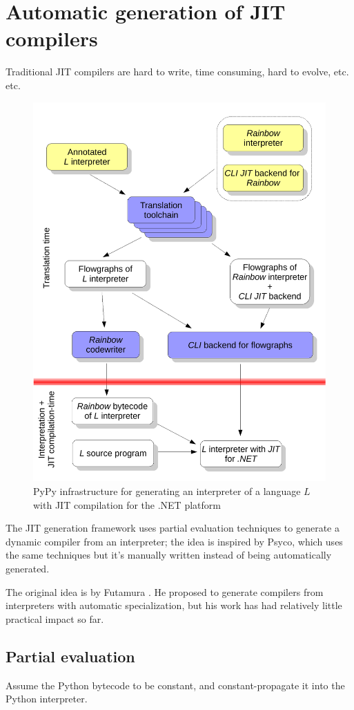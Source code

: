 \section{Automatic generation of JIT compilers}

Traditional JIT compilers are hard to write, time consuming, hard to evolve,
etc. etc.

\begin{figure}[h]
\begin{center}
\includegraphics[width=.6\textwidth]{diagram1}
\caption{PyPy infrastructure for generating an interpreter of a
  language $L$ with JIT compilation for the .NET platform}
\end{center}
\end{figure}

The JIT generation framework uses partial evaluation techniques to generate a
dynamic compiler from an interpreter; the idea is inspired by Psyco, which
uses the same techniques but it's manually written instead of being
automatically generated.

The original idea is by Futamura \cite{Futamura99}. He proposed to generate compilers
from interpreters with automatic specialization, but his work has had
relatively little practical impact so far.

\subsection{Partial evaluation}

Assume the Python bytecode to be constant, and constant-propagate it into the
Python interpreter.


